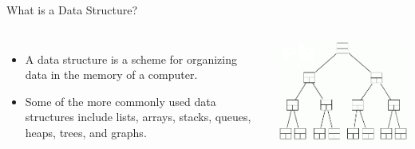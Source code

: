 \documentclass{beamer}
\begin{document}
\begin{frame}{What is a Data Structure?}
\begin{columns}[c]
\begin{itemize}
\item A data structure is a scheme for organizing data in the memory of a computer. 
\item Some of the more commonly used data structures include lists, arrays, stacks, queues, heaps, trees, and graphs.
\end{itemize}
\includegraphics[width=1.0\textwidth]{../imgs/binary-tree.png}
\end{columns}
\end{frame}
\end{document}
